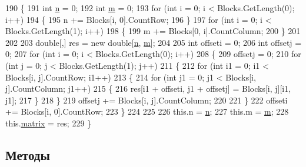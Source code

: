 \begin{DoxyCode}
190         \{
191             \textcolor{keywordtype}{int} \hyperlink{class_b_l_a_s_1_1_matrix_a0faac6434774d4c500a2dce48dcd8b84}{n} = 0;
192             \textcolor{keywordtype}{int} \hyperlink{class_b_l_a_s_1_1_matrix_aa6751bae1ef176548c952a7789953bfa}{m} = 0;
193             \textcolor{keywordflow}{for} (\textcolor{keywordtype}{int} i = 0; i < Blocks.GetLength(0); i++)
194             \{
195                 n += Blocks[i, 0].CountRow;
196             \}
197             \textcolor{keywordflow}{for} (\textcolor{keywordtype}{int} i = 0; i < Blocks.GetLength(1); i++)
198             \{
199                 m += Blocks[0, i].CountColumn;
200             \}
201 
202 
203             \textcolor{keywordtype}{double}[,] res = \textcolor{keyword}{new} \textcolor{keywordtype}{double}[\hyperlink{class_b_l_a_s_1_1_matrix_a0faac6434774d4c500a2dce48dcd8b84}{n}, \hyperlink{class_b_l_a_s_1_1_matrix_aa6751bae1ef176548c952a7789953bfa}{m}];
204 
205             \textcolor{keywordtype}{int} offseti = 0;
206             \textcolor{keywordtype}{int} offsetj = 0;
207             \textcolor{keywordflow}{for} (\textcolor{keywordtype}{int} i = 0; i < Blocks.GetLength(0); i++)
208             \{
209                 offsetj = 0;
210                 \textcolor{keywordflow}{for} (\textcolor{keywordtype}{int} j = 0; j < Blocks.GetLength(1); j++)
211                 \{
212                     \textcolor{keywordflow}{for} (\textcolor{keywordtype}{int} i1 = 0; i1 < Blocks[i, j].CountRow; i1++)
213                     \{
214                         \textcolor{keywordflow}{for} (\textcolor{keywordtype}{int} j1 = 0; j1 < Blocks[i, j].CountColumn; j1++)
215                         \{
216                             res[i1 + offseti, j1 + offsetj] = Blocks[i, j][i1, j1];
217                         \}
218                     \}
219                     offsetj += Blocks[i, j].CountColumn;
220 
221                 \}
222                 offseti += Blocks[i, 0].CountRow;
223             \}
224 
225 
226             this.n = \hyperlink{class_b_l_a_s_1_1_matrix_a0faac6434774d4c500a2dce48dcd8b84}{n};
227             this.m = \hyperlink{class_b_l_a_s_1_1_matrix_aa6751bae1ef176548c952a7789953bfa}{m};
228             this.\hyperlink{class_b_l_a_s_1_1_matrix_a715e9d838fc32eecd436e1f83ffcde79}{matrix} = res;
229         \}
\end{DoxyCode}


\subsection{Методы}
